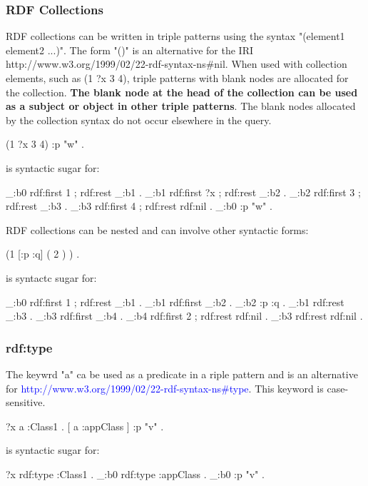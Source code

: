 \subsubsection{RDF Collections}
RDF collections can be written in triple patterns using the syntax "(element1 element2 ...)". The form "()" is an alternative for the IRI http://www.w3.org/1999/02/22-rdf-syntax-ns#nil. When used with collection elements, such as (1 ?x 3 4), triple patterns with blank nodes are allocated for the collection. \textbf{The blank node at the head of the collection can be used as a subject or object in other triple patterns}. The blank nodes allocated by the collection syntax do not occur elsewhere in the query.
\begin{fullblueverb}
(1 ?x 3 4) :p "w" .
\end{fullblueverb}
is syntactic sugar for:
\begin{fullblueverb}
 _:b0  rdf:first  1 ;
          rdf:rest   _:b1 .
_:b1  rdf:first  ?x ;
          rdf:rest   _:b2 .
_:b2  rdf:first  3 ;
      rdf:rest   _:b3 .
_:b3  rdf:first  4 ;
      rdf:rest   rdf:nil .
_:b0  :p         "w" .
\end{fullblueverb}
RDF collections can be nested and can involve other syntactic forms:
\begin{fullblueverb}
(1 [:p :q] ( 2 ) ) .
\end{fullblueverb}
is syntactc sugar for:
\begin{fullblueverb}
_:b0  rdf:first  1 ;
    rdf:rest   _:b1 .
_:b1  rdf:first  _:b2 .
_:b2  :p         :q .
_:b1  rdf:rest   _:b3 .
_:b3  rdf:first  _:b4 .
_:b4  rdf:first  2 ;
      rdf:rest   rdf:nil .
_:b3  rdf:rest   rdf:nil .
\end{fullblueverb}
\subsubsection{rdf:type}
The keywrd "a" ca be used as a predicate in a riple pattern and is an alternative for \textcolor{blue}{http://www.w3.org/1999/02/22-rdf-syntax-ns#type}. This keyword is case-sensitive.
\begin{fullblueverb}
?x  a  :Class1 .
[ a :appClass ] :p "v" .
\end{fullblueverb}
is syntactic sugar for:
\begin{fullblueverb}
?x    rdf:type  :Class1 .
_:b0  rdf:type  :appClass .
_:b0  :p        "v" .
\end{fullblueverb}